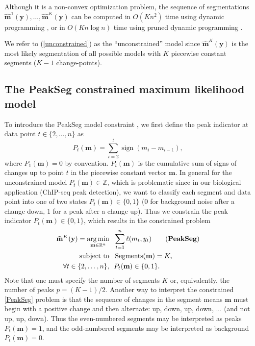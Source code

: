 \documentclass{article}
\DeclareMathOperator*{\argmin}{arg\,min}
\DeclareMathOperator*{\sign}{sign}
\DeclareMathOperator*{\Segments}{Segments}
\newcommand{\ZZ}{\mathbb Z}
\newcommand{\RR}{\mathbb R}
\begin{document}
Although it is a non-convex optimization problem, the sequence of
segmentations $\mathbf{\hat m}^1(\mathbf y), \dots, \mathbf{\hat
  m}^{K}(\mathbf y)$ can be computed in
$O(K n^2)$ time using dynamic programming
\citep{bellman}, or in $O(K n \log n)$
time using pruned dynamic programming \citep{pruned-dp, Segmentor}.

We refer to (\ref{unconstrained}) as the ``unconstrained'' model
since $\mathbf{\hat m}^K(\mathbf y)$ is the most likely segmentation
of all possible models with $K$ piecewise constant segments ($K-1$
change-points). 

\subsection{The PeakSeg constrained maximum likelihood model}
\label{sec:constrained}

To introduce the PeakSeg model constraint \citep{PeakSeg}, we first define
the peak indicator at data point $t\in\{2, \dots, n\}$ as
\begin{equation}
  \label{eq:peaks}
  P_t(\mathbf m) = \sum_{i=2}^t \sign( m_{i} - m_{i-1} ),
\end{equation}
where $P_1(\mathbf m)=0$ by convention. $P_t(\mathbf m)$ is the
cumulative sum of signs of changes up to point $t$ in the piecewise
constant vector $\mathbf m$. In general for the unconstrained model
$P_t(\mathbf m)\in\ZZ$, which is problematic since in our biological
application (ChIP-seq peak detection), we want to classify each
segment and data point into one of two states
$P_t(\mathbf m)\in \{0, 1\}$ (0 for background noise after a change
down, 1 for a peak after a change up).
Thus we constrain the peak indicator $P_t(\mathbf
m)\in\{0, 1\}$, which results
in the constrained problem
\begin{align*}
  \label{PeakSeg}
  \mathbf{\tilde m}^K(\mathbf y)  =
    \argmin_{\mathbf m\in\RR^{n}} &\ \ 
    \sum_{t=1}^n \ell( m_t,  y_t) 
    \tag{\textbf{PeakSeg}}
\\
    \text{subject to} &\ \  \Segments(\mathbf m) = K,  \\
     \forall t\in\{2, \dots, n\}, &\ \ P_t(\mathbf m) \in\{0, 1\}.
\end{align*}
Note that one must specify the number of segments $K$ or,
equivalently, the number of peaks $p=(K-1)/2$. Another way to
interpret the constrained \ref{PeakSeg} problem is that the sequence
of changes in the segment means $\mathbf m$ must begin with a positive
change and then alternate: up, down, up, down, ... (and not up, up,
down). Thus the even-numbered segments may be interpreted as peaks
$P_t(\mathbf m)=1$, and the odd-numbered segments may be interpreted
as background $P_t(\mathbf m)=0$.
\end{document}
